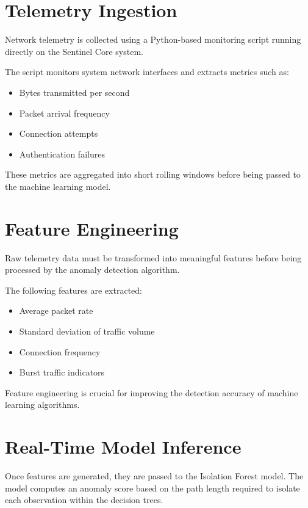 \documentclass[12pt, a4paper]{report}
\begin{document}
	\section{Telemetry Ingestion}
	
	Network telemetry is collected using a Python-based monitoring script
	running directly on the Sentinel Core system.
	
	The script monitors system network interfaces and extracts metrics such as:
	
	\begin{itemize}
		\item Bytes transmitted per second
		\item Packet arrival frequency
		\item Connection attempts
		\item Authentication failures
	\end{itemize}
	
	These metrics are aggregated into short rolling windows before being passed
	to the machine learning model.
	
	\section{Feature Engineering}
	
	Raw telemetry data must be transformed into meaningful features before
	being processed by the anomaly detection algorithm.
	
	The following features are extracted:
	
	\begin{itemize}
		\item Average packet rate
		\item Standard deviation of traffic volume
		\item Connection frequency
		\item Burst traffic indicators
	\end{itemize}
	
	Feature engineering is crucial for improving the detection accuracy of
	machine learning algorithms.
	
	\section{Real-Time Model Inference}
	
	Once features are generated, they are passed to the Isolation Forest model.
	The model computes an anomaly score based on the path length required to
	isolate each observation within the decision trees.
	
\end{document}
